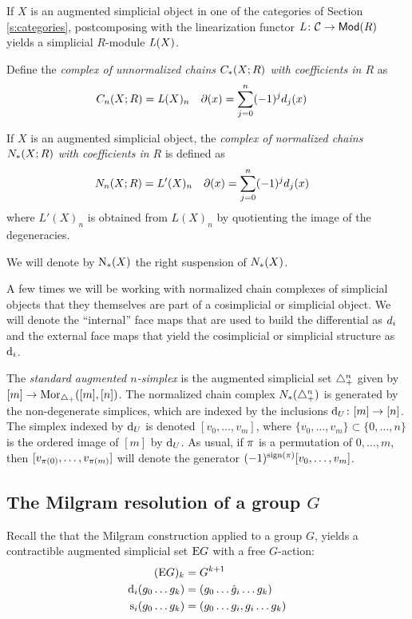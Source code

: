 If $X$ is an augmented simplicial object in one of the categories of Section \ref{s:categories}, postcomposing with the linearization functor $\abel \colon \cC \to \Mod{R}$ yields a simplicial $R$-module $\abel(X)$.

Define the \emph{complex of unnormalized chains $\ucadenas(X;R)$ with coefficients in $R$} as
\begin{align*}
	\ucadenas[n](X;R) &= \abel(X)_n
	&
	\partial(x) &= \sum_{j=0}^{n} (-1)^jd_j(x)
\end{align*}

If $X$ is an augmented simplicial object, the \emph{complex of normalized chains $\cadenas(X;R)$ with coefficients in $R$} is defined as
\begin{align*}
	\cadenas[n](X;R) &= L'(X)_n
	&
	\partial(x) &= \sum_{j=0}^{n} (-1)^jd_j(x)
\end{align*}
where $L'(X)_n$ is obtained from $L(X)_n$ by quotienting the image of the degeneracies.

\begin{notation}\label{notation:chains}
	We will denote by $\chains(X)$ the right suspension of $\cadenas(X)$.
\end{notation}

\begin{notation}
	A few times we will be working with normalized chain complexes of simplicial objects that they themselves are part of a cosimplicial or simplicial object. We will denote the ``internal'' face maps that are used to build the differential as $\diff_i$ and the external face maps that yield the cosimplicial or simplicial structure as $\d_i$.
\end{notation}

The \emph{standard augmented $n$-simplex} is the augmented simplicial set $\simplex^n_+$ given by $[m] \to \mathrm{Mor}_{\asimplex}([m],[n])$. The normalized chain complex $\cadenas(\asimplex^n)$ is generated by the non-degenerate simplices, which are indexed by the inclusions $\d_U \colon [m] \to [n]$. The simplex indexed by $\d_U$ is denoted $[v_0,\dots,v_{m}]$, where $\{v_0,\dots,v_{m}\} \subset \{0,\dots,n\}$ is the ordered image of $[m]$ by $\d_U$. As usual, if $\perm$ is a permutation of $0,\dots,m$, then $[v_{\perm(0)},\dots,v_{\perm(m)}]$ will denote the generator $(-1)^{\sign{\perm}}[v_0,\dots,v_m]$.


\subsection{The Milgram resolution of a group \texorpdfstring{$G$}{G}}

Recall the that the Milgram construction applied to a group $G$, yields a contractible augmented simplicial set $\EG$ with a free $G$-action:
\begin{align*}
	(\EG)_k &= G^{k+1}\\
	\d_i(g_0\dots g_k) &= (g_0\dots\hat{g}_i\dots g_k) \\
	\s_i(g_0\dots g_k) &= (g_0\dots g_i,g_i\dots g_k)
\end{align*}
